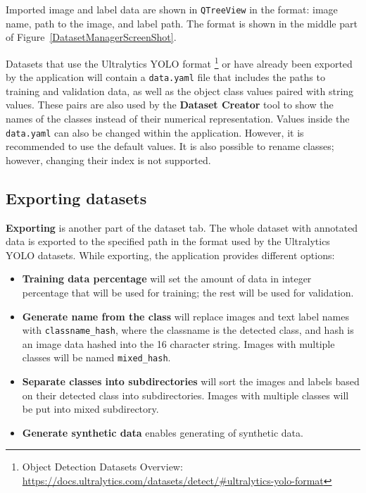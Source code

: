 Imported image and label data are shown in \texttt{QTreeView} in the format: image name, path to the image, and label path. The format is shown in the middle part of Figure~\ref{DatasetManagerScreenShot}.

Datasets that use the Ultralytics YOLO format \footnote{Object Detection Datasets Overview: \url{https://docs.ultralytics.com/datasets/detect/\#ultralytics-yolo-format}} or have already been exported by the application will contain a \texttt{data.yaml} file that includes the paths to training and validation data, as well as the object class values paired with string values. These pairs are also used by the \textbf{Dataset Creator} tool to show the names of the classes instead of their numerical representation. Values inside the \texttt{data.yaml} can also be changed within the application. However, it is recommended to use the default values. It is also possible to rename classes; however, changing their index is not supported.


\subsection{Exporting datasets}
\textbf{Exporting} is another part of the dataset tab. The whole dataset with annotated data is exported to the specified path in the format used by the Ultralytics YOLO datasets. While exporting, the application provides different options: 

\bigskip
\begin{itemize}
  \item {\textbf{Training data percentage} will set the amount of data in integer percentage that will be used for training; the rest will be used for validation.}
  
  \item {\textbf{Generate name from the class} will replace images and text label names with \texttt{classname\_hash}, where the classname is the detected class, and hash is an image data hashed into the 16 character string. Images with multiple classes will be named \texttt{mixed\_hash}.}
  
  \item {\textbf{Separate classes into subdirectories} will sort the images and labels based on their detected class into subdirectories. Images with multiple classes will be put into mixed subdirectory.}
  
  \item {\textbf{Generate synthetic data} enables generating of synthetic data.}
\end{itemize}
\bigskip


